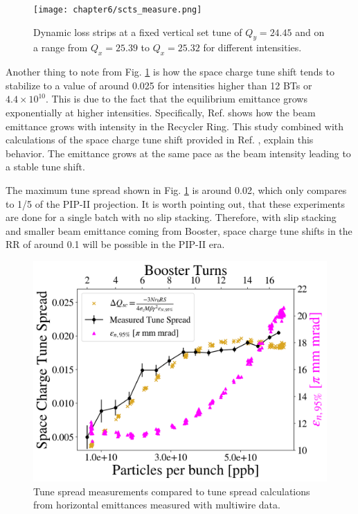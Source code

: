 \newpage
\begin{figure}[H]
    \centering
    \texttt{[image: chapter6/scts\_measure.png]}
    \caption{Dynamic loss strips at a fixed vertical set tune of $Q_y=24.45$ and on a range from $Q_x=25.39$ to $Q_x=25.32$ for different intensities.}
    \label{fig:dynamictunespread}
\end{figure}
\newpage

Another thing to note from Fig. \ref{fig:dynamictunespread} is how the space charge tune shift tends to stabilize to a value of around 0.025 for intensities higher than 12 BTs or $4.4\times 10^{10}$. This is due to the fact that the equilibrium emittance grows exponentially at higher intensities. Specifically, Ref. \cite{betiay} shows how the beam emittance grows with intensity in the Recycler Ring. This study combined with calculations of the space charge tune shift provided in Ref. \cite{zhang}, explain this behavior. The emittance grows at the same pace as the beam intensity leading to a stable tune shift.

The maximum tune spread shown in Fig. \ref{fig:dynamictunespread} is around 0.02, which only compares to 1/5 of the PIP-II projection. It is worth pointing out, that these experiments are done for a single batch with no slip stacking. Therefore, with slip stacking and smaller beam emittance coming from Booster, space charge tune shifts in the RR of around 0.1 will be possible in the PIP-II era.  

\begin{figure}[H]
    \centering
    \includegraphics[width=\columnwidth]{chapter6/tune_spread.png}
    \caption{Tune spread measurements compared to tune spread calculations from horizontal emittances measured with multiwire data.}
    \label{fig:tunespread}
\end{figure}

